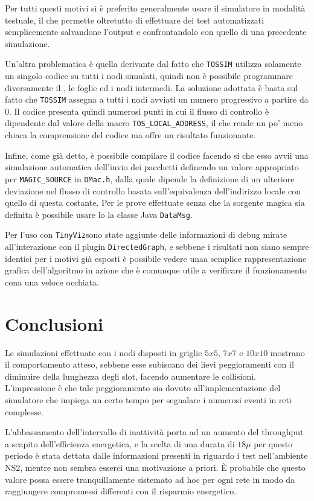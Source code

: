 \documentclass[twoside,11pt,a4paper,italian,openany]{book}
\newcommand{\tv}{\texttt{TinyViz}}
\newcommand{\tos}{\texttt{TOSSIM} }
\begin{document}
Per tutti questi motivi si è preferito generalmente usare il simulatore in modalità testuale, 
il che permette oltretutto di effettuare dei test automatizzati semplicemente salvandone
 l'output e confrontandolo con quello di una precedente simulazione. 

Un'altra problematica è quella derivante dal fatto che \tos utilizza solamente un singolo 
codice su tutti i nodi simulati, quindi non è possibile programmare diversamente il \sink, 
le foglie ed i nodi intermedi. 
La soluzione adottata è basta sul fatto che \tos assegna a tutti i nodi avviati un numero 
progressivo a partire da $0$. 
Il codice presenta quindi numerosi punti in cui il flusso di controllo 
è dipendente dal valore della macro \texttt{TOS\_LOCAL\_ADDRESS}, il che rende un po' meno 
chiara la comprensione del codice ma offre un risultato funzionante. 

Infine, come già detto, è possibile compilare il codice facendo si che esso avvii una 
simulazione automatica dell'invio dei pacchetti definendo un valore appropriato per 
\texttt{MAGIC\_SOURCE} in \texttt{DMac.h}, dalla quale dipende la definizione di un ulteriore 
deviazione nel flusso di controllo basata sull'equivalenza dell'indirizzo locale con quello di 
questa costante. 
Per le prove effettuate senza che la sorgente magica sia definita è possibile usare lo 
la classe Java \texttt{DataMsg}.

Per l'uso con \tv sono state aggiunte delle informazioni di debug mirate all'interazione con 
il plugin  \texttt{DirectedGraph}, e sebbene i risultati non siano sempre identici per i 
motivi già esposti è possibile vedere unaa semplice rappresentazione grafica dell'algoritmo 
in azione che è comunque utile a verificare il funzionamento cona una veloce occhiata. 

\chapter{Conclusioni}
Le simulazioni effettuate con i nodi disposti in griglie $5x5$, $7x7$ e $10x10$ mostrano il
comportamento atteso, sebbene esse subiscano dei lievi peggioramenti con il diminuire della 
lunghezza degli slot, facendo aumentare le collisioni.
L'impressione è che tale peggioramento sia dovuto all'implementazione del simulatore 
che impiega un certo tempo per segnalare i numerosi eventi in reti complesse.

L'abbassamento dell'intervallo di inattività porta ad un aumento del throughput 
a scapito dell'efficienza energetica, e la scelta di una durata di $18\mu$ per questo periodo 
è stata dettata dalle informazioni presenti in \cite{DMAC} riguardo i test nell'ambiente 
NS2, mentre non sembra esserci una motivazione a priori. \`E probabile che questo valore 
possa essere tranquillamente sistemato ad hoc per ogni rete in modo da raggiungere compromessi 
differenti con il risparmio energetico. 
\end{document}
